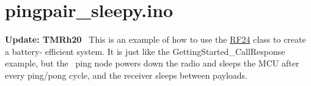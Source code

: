 \hypertarget{pingpair_sleepy_8ino-example}{\section{pingpair\+\_\+sleepy.\+ino}
}
{\bfseries Update\+: T\+M\+Rh20}~\newline
 This is an example of how to use the \hyperlink{class_r_f24}{R\+F24} class to create a battery-\/ efficient system. It is just like the Getting\+Started\+\_\+\+Call\+Response example, but the~\newline
 ping node powers down the radio and sleeps the M\+C\+U after every ping/pong cycle, and the receiver sleeps between payloads. ~\newline



\begin{DoxyCodeInclude}
\end{DoxyCodeInclude}
 
